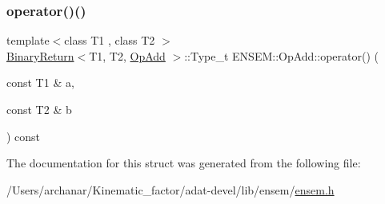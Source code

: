 \subsubsection{\texorpdfstring{operator()()}{operator()()}\hspace{0.1cm}{\footnotesize\ttfamily [3/3]}}
{\footnotesize\ttfamily template$<$class T1 , class T2 $>$ \\
\mbox{\hyperlink{structENSEM_1_1BinaryReturn}{Binary\+Return}}$<$T1, T2, \mbox{\hyperlink{structENSEM_1_1OpAdd}{Op\+Add}} $>$\+::Type\+\_\+t E\+N\+S\+E\+M\+::\+Op\+Add\+::operator() (\begin{DoxyParamCaption}\item[{const T1 \&}]{a,  }\item[{const T2 \&}]{b }\end{DoxyParamCaption}) const\hspace{0.3cm}{\ttfamily [inline]}}



The documentation for this struct was generated from the following file\+:\begin{DoxyCompactItemize}
\item 
/\+Users/archanar/\+Kinematic\+\_\+factor/adat-\/devel/lib/ensem/\mbox{\hyperlink{adat-devel_2lib_2ensem_2ensem_8h}{ensem.\+h}}\end{DoxyCompactItemize}
